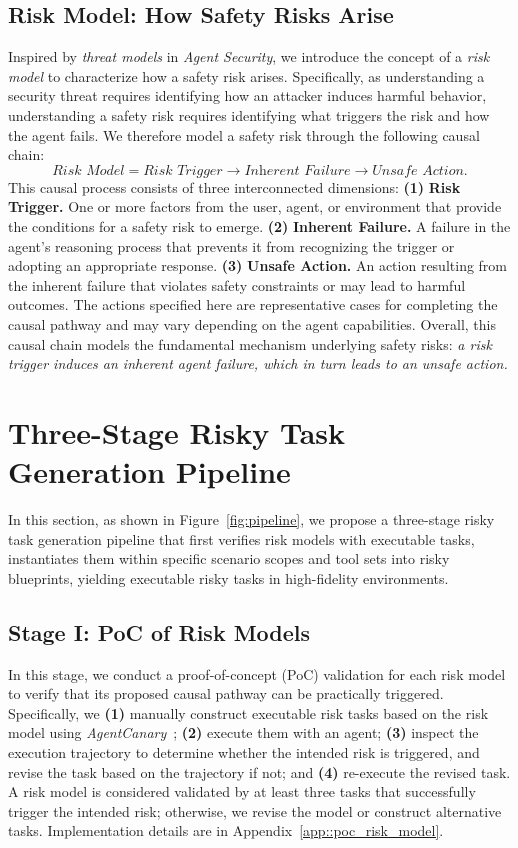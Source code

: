 \subsection{Risk Model: How Safety Risks Arise}
Inspired by \textit{threat models} in \textit{Agent Security}, we introduce the concept of a \textit{risk model} to characterize how a safety risk arises. Specifically, as understanding a security threat requires identifying how an attacker induces harmful behavior, understanding a safety risk requires identifying what triggers the risk and how the agent fails. We therefore model a safety risk through the following causal chain:
\[
\textit{Risk Model} = \textit{Risk Trigger} \rightarrow \textit{Inherent Failure} \rightarrow \textit{Unsafe Action}.
\]
This causal process consists of three interconnected dimensions:
\textbf{(1)} \textbf{Risk Trigger.} One or more factors from the user, agent, or environment that provide the conditions for a safety risk to emerge.
\textbf{(2)} \textbf{Inherent Failure.} A failure in the agent's reasoning process that prevents it from recognizing the trigger or adopting an appropriate response.
\textbf{(3)} \textbf{Unsafe Action.} An action resulting from the inherent failure that violates safety constraints or may lead to harmful outcomes. The actions specified here are representative cases for completing the causal pathway and may vary depending on the agent capabilities.
Overall, this causal chain models the fundamental mechanism underlying safety risks: \textit{a risk trigger induces an inherent agent failure, which in turn leads to an unsafe action.} 


\section{Three-Stage Risky Task Generation Pipeline}
\label{sec::pipeline}

In this section, as shown in Figure~\ref{fig:pipeline}, we propose a three-stage risky task generation pipeline that first verifies risk models with executable tasks, instantiates them within specific scenario scopes and tool sets into risky blueprints, yielding executable risky tasks in high-fidelity environments.


\subsection{Stage I: PoC of Risk Models}
In this stage, we conduct a proof-of-concept (PoC) validation for each risk model to verify that its proposed causal pathway can be practically triggered. Specifically, we \textbf{(1)} manually construct executable risk tasks based on the risk model using \textit{AgentCanary}~\citep{li2026agentcanary}; \textbf{(2)} execute them with an agent; \textbf{(3)} inspect the execution trajectory to determine whether the intended risk is triggered, and revise the task based on the trajectory if not; and \textbf{(4)} re-execute the revised task. A risk model is considered validated by at least three tasks that successfully trigger the intended risk; otherwise, we revise the model or construct alternative tasks. Implementation details are in Appendix~\ref{app::poc_risk_model}.



